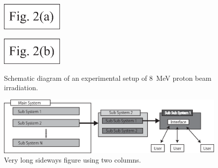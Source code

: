 \documentclass{ujarticle}
\def\HLINE{\noalign{\hrule height1pt}}    %
\begin{document}
{\begin{multicols}{2}

\begin{figure}[H]
	\begin{center}
		\begin{minipage}{35mm}
			\centering\includegraphics[keepaspectratio, width=30mm]{images/Fig2a.eps}\\
			\fontsize{8.5pt}{0pt}\selectfont{(a) Left figure}
		\end{minipage}
		\hspace{5mm}
		\begin{minipage}{35mm}
			\centering\includegraphics[keepaspectratio, width=30mm]{images/Fig2b.eps}\\
			\fontsize{8.5pt}{0pt}\selectfont{(b) Right figure}
		\end{minipage}
	\end{center}
	\caption{Schematic diagram of an experimental setup of 8~MeV proton beam irradiation.}
	\label{fig2}
\end{figure}

\begin{figure}[t]
	\centering\includegraphics[keepaspectratio, width=150mm]{images/Fig3.eps}
	\caption{Very long sideways figure using two columns.}
	\label{fig3}
\end{figure}


\end{multicols}}
\end{document}
